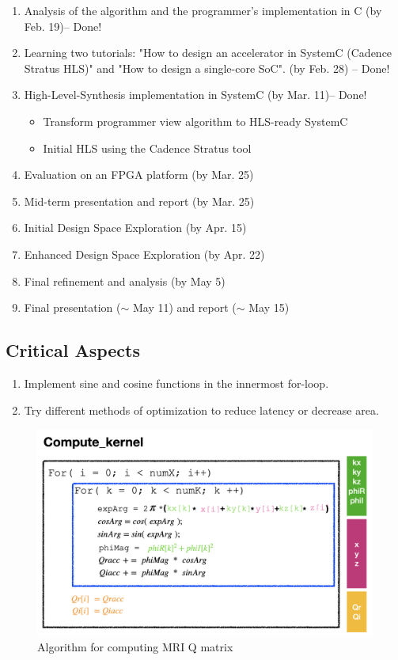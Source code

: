 \documentclass{sig-alternate}
\begin{document}
\vspace{-0.1in}
\begin{enumerate}
\setlength\itemsep{-0.15em}
  \item Analysis of the algorithm and the programmer's implementation in C (by Feb. 19)-- Done!
  \item Learning two tutorials: "How to design an accelerator in SystemC (Cadence Stratus HLS)" and "How to design a single-core SoC"\cite{esp1}. (by Feb. 28) -- Done!
  \item High-Level-Synthesis implementation in SystemC (by Mar. 11)-- Done!
  \vspace{-2mm}
       \begin{itemize}
            \item Transform programmer view algorithm to HLS-ready SystemC
            \item Initial HLS using the Cadence Stratus tool
       \end{itemize}

  \item Evaluation on an FPGA platform (by Mar. 25)
  \item Mid-term presentation and report (by Mar. 25)
  \item Initial Design Space Exploration (by Apr. 15)
  \item Enhanced Design Space Exploration (by Apr. 22)
  \item Final refinement and analysis (by May 5)
  \item Final presentation ($\sim$ May 11) and report ($\sim$ May 15)
\end{enumerate}

\subsection{Critical Aspects}
\begin{enumerate}
\setlength\itemsep{-0.15em}
\item Implement sine and cosine functions in the innermost for-loop.
\item Try different methods of optimization to reduce latency or decrease area.
\end{enumerate}

\begin{figure}[t]
\centering
\captionsetup{justification=centering, format=hang}
\includegraphics[width=0.85\columnwidth]{figure/algorithm.png}
\caption{Algorithm for computing MRI Q matrix~\cite{stone2008accelerating}}
\label{fig-1}
\end{figure}
\end{document}
